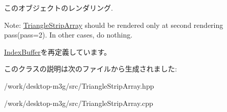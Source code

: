 このオブジェクトのレンダリング.

Note: \hyperlink{classm3g_1_1TriangleStripArray}{TriangleStripArray} should be rendered only at second rendering pass(pass=2). In other cases, do nothing. 

\hyperlink{classm3g_1_1IndexBuffer_1efcb1973989d9963d5bd6d03065d389}{IndexBuffer}を再定義しています。

このクラスの説明は次のファイルから生成されました:\begin{CompactItemize}
\item 
/work/desktop-m3g/src/TriangleStripArray.hpp\item 
/work/desktop-m3g/src/TriangleStripArray.cpp\end{CompactItemize}
